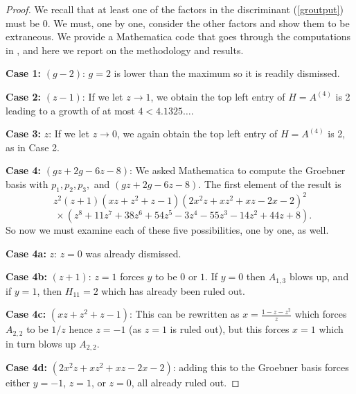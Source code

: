 \documentclass[reqno]{amsart}
\numberwithin{equation}{section}
\begin{document}
\begin{proof}
We recall that at least one of the factors in the
discriminant (\ref{groutput}) must be $0$.
We must, one by one, consider the other factors and show them to be extraneous.  We provide a Mathematica code that goes through the computations in \cite{githubrepo}, and here we report
on the methodology and results.

\noindent
\textbf{Case 1:} $(g-2)$: $g=2$  is lower than the maximum so it is readily dismissed.


\noindent
\textbf{Case 2:}  $(z-1)$: If we let $z\rightarrow 1$, we obtain
the top left entry of $H=A^{(4)}$ is 2 leading to a growth of \phantom{.}\hspace{1.2 cm} at most $4<4.1325\ldots$.

\noindent
\textbf{Case 3:}  $z$:  If we let $z\rightarrow 0$, we  again obtain
the top left entry of $H=A^{(4)}$ is 2, as in Case 2.

\noindent
\textbf{Case 4:} $(gz+2g-6z-8)$:  We asked Mathematica to compute the Groebner basis with $p_1,p_2,p_3,$ and \phantom{.}\hspace{1.2 cm} $(gz+2g-6z-8)$.
The first element of the result is
$$
z^2 (z+1)    
(xz+z^2+z-1)
   (2 x^2 z+x z^2+x z-2 x-2)^2
   $$  
   $$
   \ \  \  \times
   \left(z^8+11 z^7+38 z^6+54 z^5-3 z^4-55 z^3-14 z^2+44 z+8\right) .
$$
\phantom{.}\hspace{1.3 cm}So now we must examine each of these five possibilities,
one by one, as well.

\noindent\phantom{.}\hspace{1.3 cm}\textbf{Case 4a:} $z$: $z=0$ was already dismissed.

\noindent\phantom{.}\hspace{1.3 cm}\textbf{Case 4b:} $(z+1)$: $z=1$ forces $y$ to be $0$ or $1$.
If $y=0$ then $A_{1,3}$ blows up, and if $y=1$, then \noindent\phantom{.}\hspace{1.3 cm}$H_{11}=2$ which has already been ruled out.

\noindent\phantom{.}\hspace{1.3 cm}\textbf{Case 4c:} $(xz+z^2+z-1)$: This can be rewritten as
$x=\frac{1-z-z^2}{z}$ which forces $A_{2,2}$ to be $1/z$ \noindent\phantom{.}\hspace{1.3 cm}hence $z=-1$ (as $z=1$ is ruled out), but this forces $x=1$
which in turn blows up $A_{2,2}$.

\noindent\phantom{.}\hspace{1.3 cm}\textbf{Case 4d:} $(2x^2z+xz^2+xz-2x-2)$: adding this to the Groebner basis forces either $y=-1$, \noindent\phantom{.}\hspace{1.3 cm} $z=1$, or $z=0$, all already ruled out.


\end{proof}
\end{document}
